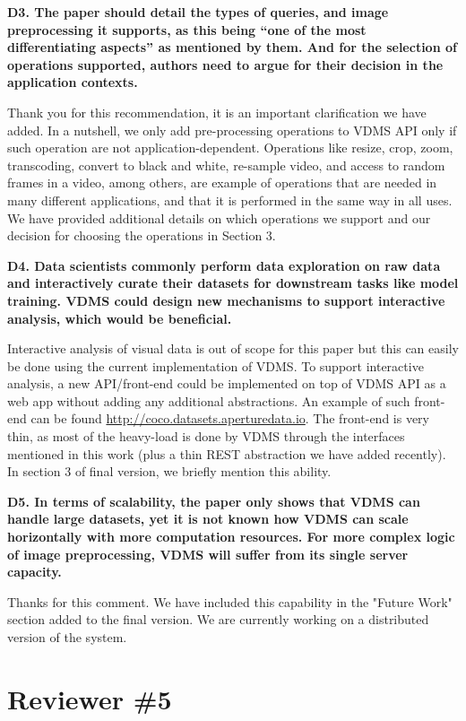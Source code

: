 \documentclass[11pt]{proposalnsf}
\begin{document}
\bigskip
\noindent %
\textbf{
D3. The paper should detail the types of queries, and image preprocessing it supports,
as this being “one of the most differentiating aspects” as mentioned by them.
And for the selection of operations supported, authors need to argue for their
decision in the application contexts.
}\bigskip

Thank you for this recommendation, it is an important clarification we have added.
In a nutshell, we only add pre-processing operations to VDMS API only if such
operation are not application-dependent.
Operations like resize, crop, zoom, transcoding, convert to black and white,
re-sample video, and access to random frames in a video, among others, are
example of operations that are needed in many different applications,
and that it is performed in the same way in all uses.
We have provided additional details on which operations we support and our
decision for choosing the operations in Section 3.

\bigskip
\noindent %
\textbf{
D4. Data scientists commonly perform data exploration on raw data and interactively
curate their datasets for downstream tasks like model training.
VDMS could design new mechanisms to support interactive analysis,
which would be beneficial.
}\bigskip

Interactive analysis of visual data is out of scope for this paper
but this can easily be done using the current implementation of VDMS.
To support interactive analysis, a new API/front-end could be implemented on top of
VDMS API as a web app without adding any additional abstractions.
An example of such front-end can be found \url{http://coco.datasets.aperturedata.io}.
The front-end is very thin, as most of the heavy-load is done by VDMS through
the interfaces mentioned in this work
(plus a thin REST abstraction we have added recently).
In section 3 of final version, we briefly mention this ability.

\bigskip
\noindent %
\textbf{
D5. In terms of scalability, the paper only shows that VDMS can handle large
datasets, yet it is not known how VDMS can scale horizontally with more
computation resources.
For more complex logic of image preprocessing, VDMS will suffer from its
single server capacity.
}\bigskip

Thanks for this comment.
We have included this capability in the "Future Work" section
added to the final version.
We are currently working on a distributed version of the system.

\newpage
\section{Reviewer \#5}
\end{document}
